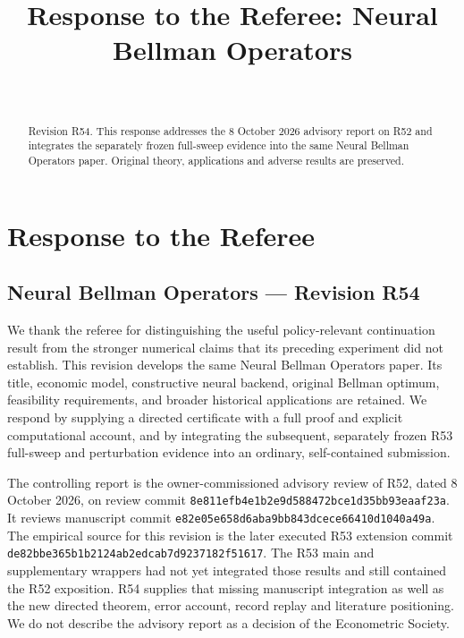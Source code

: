 \documentclass[ecta,nameyear,draft]{econsocart}
\begin{document}
\begin{frontmatter}
\title{Response to the Referee: Neural Bellman Operators}
\begin{aug}
\author[id=au1,addressref={add1}]{~}
\address[id=add1]{Peking University}
\end{aug}
\begin{abstract}Revision R54. This response addresses the 8 October 2026 advisory report on R52 and integrates the separately frozen full-sweep evidence into the same Neural Bellman Operators paper. Original theory, applications and adverse results are preserved.\end{abstract}
\end{frontmatter}
\hypertarget{response-to-the-referee}{%
\section{Response to the Referee}\label{response-to-the-referee}}

\hypertarget{neural-bellman-operators-revision-r54}{%
\subsection{Neural Bellman Operators --- Revision
R54}\label{neural-bellman-operators-revision-r54}}

We thank the referee for distinguishing the useful policy-relevant
continuation result from the stronger numerical claims that its
preceding experiment did not establish. This revision develops the same
Neural Bellman Operators paper. Its title, economic model, constructive
neural backend, original Bellman optimum, feasibility requirements, and
broader historical applications are retained. We respond by supplying a
directed certificate with a full proof and explicit computational
account, and by integrating the subsequent, separately frozen R53
full-sweep and perturbation evidence into an ordinary, self-contained
submission.

The controlling report is the owner-commissioned advisory review of R52,
dated 8 October 2026, on review commit
\nolinkurl{8e811efb4e1b2e9d588472bce1d35bb93eaaf23a}. It reviews manuscript
commit \nolinkurl{e82e05e658d6aba9bb843dcece66410d1040a49a}. The empirical
source for this revision is the later executed R53 extension commit
\nolinkurl{de82bbe365b1b2124ab2edcab7d9237182f51617}. The R53 main and
supplementary wrappers had not yet integrated those results and still
contained the R52 exposition. R54 supplies that missing manuscript
integration as well as the new directed theorem, error account, record
replay and literature positioning. We do not describe the advisory
report as a decision of the Econometric Society.
\end{document}
